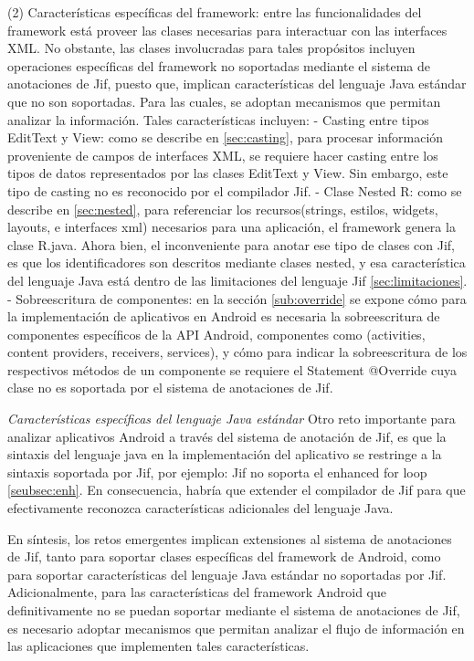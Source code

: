 (2) Características específicas del framework: entre las funcionalidades del
framework está proveer las clases necesarias para interactuar con las interfaces
XML. No obstante, las clases involucradas para tales propósitos incluyen
operaciones específicas del framework no soportadas mediante el sistema de
anotaciones de Jif, puesto que, implican características del lenguaje Java
estándar que no son soportadas. Para las cuales, se adoptan mecanismos que
permitan analizar la información. Tales características incluyen:\newline 
- Casting entre tipos EditText y View: como se describe en
\ref{sec:casting}, para procesar información proveniente de campos de interfaces XML, se requiere
hacer casting entre los tipos de datos representados por las clases EditText y
View. Sin embargo, este tipo de casting no es reconocido por el compilador
Jif.\newline 
- Clase Nested R: como se describe en \ref{sec:nested}, para referenciar los
recursos(strings, estilos, widgets, layouts, e interfaces xml) necesarios para
una aplicación, el framework genera la clase R.java. Ahora bien, el
inconveniente para anotar ese tipo de clases con Jif, es que los identificadores
son descritos mediante clases nested, y esa característica del lenguaje Java
está dentro de las limitaciones del lenguaje Jif \ref{sec:limitaciones}.\newline 
- Sobreescritura de componentes: en la sección \ref{sub:override} se expone
cómo para la implementación de aplicativos en Android es necesaria la
sobreescritura de componentes específicos de la API Android, componentes como
(activities, content providers, receivers, services), y cómo para indicar la
sobreescritura de los respectivos métodos de un componente se requiere el
Statement @Override cuya clase no es soportada por el sistema de anotaciones de
Jif.

\emph{Características específicas del lenguaje Java estándar}\newline
Otro reto importante para analizar aplicativos Android a través del sistema de
anotación de Jif, es que la sintaxis del lenguaje java en la implementación del
aplicativo se restringe a la sintaxis soportada por Jif, por ejemplo: Jif no
soporta el enhanced for loop \ref{seubsec:enh}. En consecuencia, habría que
extender el compilador de Jif para que efectivamente reconozca características
adicionales del lenguaje Java.

En síntesis, los retos emergentes implican extensiones al sistema de
anotaciones de Jif, tanto para soportar clases específicas del framework de
Android, como para soportar características del lenguaje Java estándar no
soportadas por Jif.\newline
Adicionalmente, para las características del framework Android que
definitivamente no se puedan soportar mediante el sistema de anotaciones de Jif,
es necesario adoptar mecanismos que permitan analizar el flujo de información en
las aplicaciones que implementen tales características.\newline

